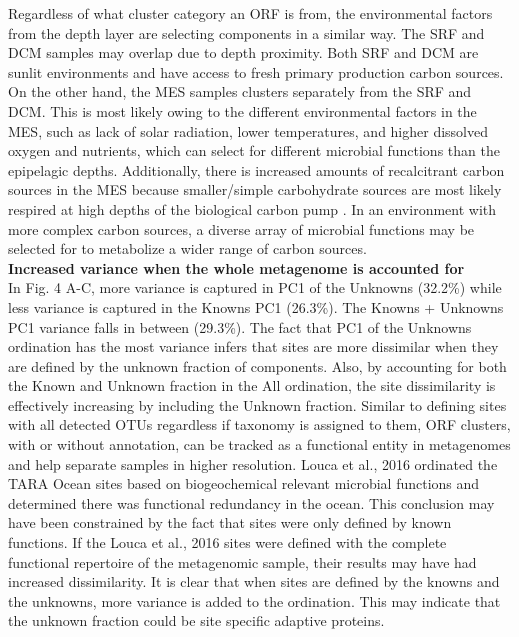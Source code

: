 Regardless of what cluster category an ORF is from, the environmental factors from the depth layer are selecting components in a similar way. The SRF and DCM samples may overlap due to depth proximity. Both SRF and DCM are sunlit environments and have access to fresh primary production carbon sources. On the other hand, the MES samples clusters separately from the SRF and DCM. This is most likely owing to the different environmental factors in the MES, such as lack of solar radiation, lower temperatures, and higher dissolved oxygen and nutrients, which can select for different microbial functions than the epipelagic depths. Additionally, there is increased amounts of recalcitrant carbon sources in the MES because smaller/simple carbohydrate sources are most likely respired at high depths of the biological carbon pump \citep{Azam_2007}. In an environment with more complex carbon sources, a diverse array of microbial functions may be selected for to metabolize a wider range of carbon sources.\\

\textbf{Increased variance when the whole metagenome is accounted for}\\

In Fig. 4 A-C, more variance is captured in PC1 of the Unknowns (32.2\%) while less variance is captured in the Knowns PC1 (26.3\%). The Knowns + Unknowns PC1 variance falls in between (29.3\%). The fact that PC1 of the Unknowns ordination has the most variance infers that sites are more dissimilar when they are defined by the unknown fraction of components. Also, by accounting for both the Known and Unknown fraction in the All ordination, the site dissimilarity is effectively increasing by including the Unknown fraction. 
Similar to defining sites with all detected OTUs regardless if taxonomy is assigned to them, ORF clusters, with or without annotation, can be tracked as a functional entity in metagenomes and help separate samples in higher resolution. Louca et al., 2016 ordinated the TARA Ocean sites based on biogeochemical relevant microbial functions and determined there was functional redundancy in the ocean. This conclusion may have been constrained by the fact that sites were only defined by known functions. If the Louca et al., 2016 sites were defined with the complete functional repertoire of the metagenomic sample, their results may have had increased dissimilarity. It is clear that when sites are defined by the knowns and the unknowns, more variance is added to the ordination. This may indicate that the unknown fraction could be site specific adaptive proteins. \\

